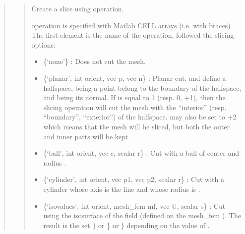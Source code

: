 \documentclass[a4paper,11pt,english]{sphinxmanual}
\begin{document}
\begin{quote}

\begin{quote}

Create a slice using  operation.

 operation is specified with Matlab CELL arrays (i.e.
with braces) . The first element is the
name of the operation, followed the slicing options:
\begin{itemize}
\item {} 
\{‘none’\} :
Does not cut the mesh.

\item {} 
\{‘planar’, int orient, vec p, vec n\} :
Planar cut.  and  define a half\sphinxhyphen{}space,  being a point belong to
the boundary of the half\sphinxhyphen{}space, and  being its normal. If  is
equal to \sphinxhyphen{}1 (resp. 0, +1), then the slicing operation will cut the mesh
with the “interior” (resp. “boundary”, “exterior”) of the half\sphinxhyphen{}space.
 may also be set to +2 which means that the mesh will be sliced,
but both the outer and inner parts will be kept.

\item {} 
\{‘ball’, int orient, vec c, scalar r\} :
Cut with a ball of center  and radius .

\item {} 
\{‘cylinder’, int orient, vec p1, vec p2, scalar r\} :
Cut with a cylinder whose axis is the line  and whose radius
is .

\item {} 
\{‘isovalues’, int orient, mesh\_fem mf, vec U, scalar s\} :
Cut using the isosurface of the field  (defined on the mesh\_fem ).
The result is the set \}\textasciigrave{} or \}\textasciigrave{} or \}\textasciigrave{} depending on the value of
.


\end{itemize}
\end{quote}
\end{quote}
\end{document}
